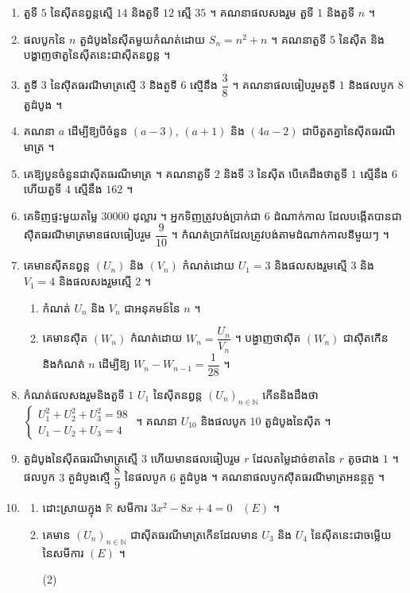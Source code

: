 \begin{enumerate}[1]
  \item តួទី $5$ នៃស៊ីតនព្វន្តស្មើ $14$ និងតួទី $12$ ស្មើ $35$ ។ គណនាផលសងរួម តួទី $1$ និងតួទី $n$ ។
  \item ផលបូកនៃ $n$ តួដំបូងនៃស៊ីតមួយកំណត់ដោយ $S_n = n^2 + n$ ។ គណនាតួទី $5$ នៃស៊ីត និងបង្ហាញថាតួនៃស៊ីតនេះជាស៊ីតនព្វន្ត ។
  \item តួទី $3$ នៃស៊ីតធរណីមាត្រស្មើ $3$ និងតួទី $6$ ស្មើនឹង $\dfrac{3}{8}$ ។ គណនាផលធៀបរួមតួទី $1$ និងផលបូក $8$ តួដំបូង ។
  \item គណនា $a$ ដើម្បីឱ្យបីចំនួន $(a - 3)$, $(a + 1)$ និង $(4a - 2)$ ជាបីតួតគ្នានៃស៊ីតធរណីមាត្រ ។
  \item គេឱ្យបួនចំនួនជាស៊ីតធរណីមាត្រ ។ គណនាតួទី $2$ និងទី $3$ នៃស៊ីត បើគេដឹងថាតួទី $1$ ស្មើនឹង $6$ ហើយតួទី $4$ ស្មើនឹង $162$ ។
  \item គេទិញផ្ទះមួយតម្លៃ $30000$ ដុល្លារ ។ អ្នកទិញត្រូវបង់ប្រាក់ជា $6$ ដំណាក់កាល ដែលបង្កើតបានជាស៊ីតធរណីមាត្រមានផលធៀបរួម $\dfrac{9}{10}$ ។ កំណត់ប្រាក់ដែលត្រូវបង់តាមដំណាក់កាលនីមួយៗ ។
  \item គេមានស៊ីតនព្វន្ត $(U_n)$ និង $(V_n)$ កំណត់ដោយ $U_1 = 3$ និងផលសងរួមស្មើ $3$ និង $V_1 = 4$ និងផលសងរួមស្មើ $2$ ។
  \begin{enumerate}[a]
    \item កំណត់ $U_n$ និង $V_n$ ជាអនុគមន៍នៃ $n$ ។
    \item គេមានស៊ីត $(W_n)$ កំណត់ដោយ $W_n = \dfrac{U_n}{V_n}$ ។ បង្ហាញថាស៊ីត $(W_n)$ ជាស៊ីតកើន និងកំណត់ $n$ ដើម្បីឱ្យ $W_n - W_{n-1} = \dfrac{1}{28}$ ។
  \end{enumerate}
  \item កំណត់ផលសងរួមនិងតួទី $1$ $U_1$ នៃស៊ីតនព្វន្ត $(U_n)_{n \in \mathbb{N}}$ កើននិងដឹងថា $\begin{cases} U_1^2 + U_2^2 + U_3^2 = 98\\ U_1 - U_2 + U_3 = 4 \end{cases}$ ។ គណនា $U_{10}$ និងផលបូក $10$ តួដំបូងនៃស៊ីត ។
  \item តួដំបូងនៃស៊ីតធរណីមាត្រស្មើ $3$ ហើយមានផលធៀបរួម $r$ ដែលតម្លៃដាច់ខាតនៃ $r$ តូចជាង $1$ ។ ផលបូក $3$ តួដំបូងស្មើ $\dfrac{8}{9}$ នៃផលបូក $6$ តួដំបូង ។ គណនាផលបូកស៊ីតធរណីមាត្រអនន្តតួ ។
  \item
  \begin{enumerate}[1]
    \item ដោះស្រាយក្នុង $\mathbb{R}$ សមីការ $3x^2 - 8x + 4 = 0$ \ $(E)$ ។
    \item គេមាន $(U_n)_{n \in \mathbb{N}}$ ជាស៊ីតធរណីមាត្រកើនដែលមាន $U_3$ និង $U_4$ នៃស៊ីតនេះជាចម្លើយនៃសមីការ $(E)$ ។
    \begin{tasks}(2)

\end{tasks}
\end{enumerate}
\end{enumerate}

